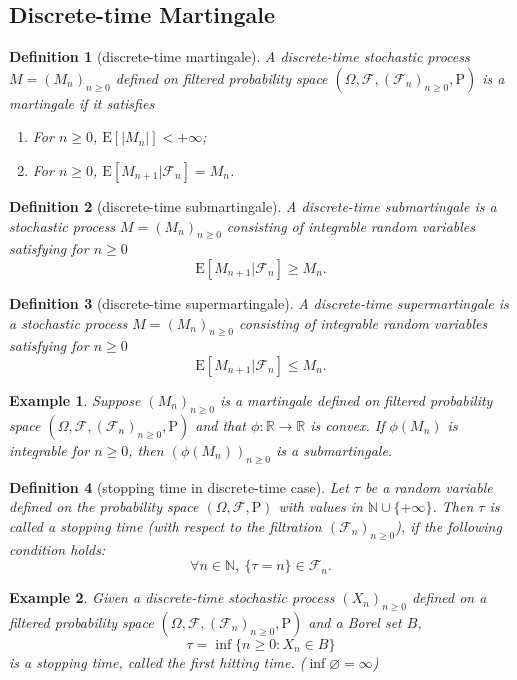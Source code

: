 \documentclass{article}
\newtheorem{definition}{Definition}[section]
\newtheorem{example}{Example}[section]
\theoremstyle{nonumberplain}
\begin{document}
\subsection{Discrete-time Martingale}
\begin{definition}[discrete-time martingale]
	A discrete-time stochastic process $M=(M_n)_{n\ge 0}$ defined on filtered probability space $(\Omega,\mathcal{F},(\mathcal{F}_{n})_{n\ge0},\mathrm{P})$ is a \emph{martingale} if it satisfies
	\begin{enumerate}
		\item For $n\ge0$, $\mathrm{E}[|M_n|]<+\infty$;
		\item For $n\ge0$, $\mathrm{E}[M_{n+1}|\mathcal{F}_n]=M_n$.
	\end{enumerate}
\end{definition}
\begin{definition}[discrete-time submartingale]
A discrete-time \emph{submartingale} is a stochastic process $M=(M_n)_{n\ge 0}$ consisting of integrable random variables satisfying for $n\ge0$
\[
\mathrm{E}[M_{n+1}|\mathcal{F}_n]\ge M_n.
\]
\end{definition}
\begin{definition}[discrete-time supermartingale]
	A discrete-time \emph{supermartingale} is a stochastic process $M=(M_n)_{n\ge 0}$ consisting of integrable random variables satisfying for $n\ge0$
	\[
	\mathrm{E}[M_{n+1}|\mathcal{F}_n]\le M_n.
	\]
\end{definition}

\begin{example}
	Suppose $(M_n)_{n\ge 0}$ is a martingale defined on filtered probability space $(\Omega,\mathcal{F},(\mathcal{F}_{n})_{n\ge0},\mathrm{P})$ and that $\phi:\mathbb{R}\to\mathbb{R}$ is convex. If $\phi(M_n)$ is integrable for $n\ge0$, then $\left(\phi(M_n)\right)_{n\ge 0}$ is a submartingale.
\end{example}

\begin{definition}[stopping time in discrete-time case]
	Let $\tau$  be a random variable defined on the probability space $(\Omega,\mathcal{F},\mathrm{P})$ with values in $\mathbb{N}\cup\{+\infty\}$. Then $\tau$ is called a stopping time (with respect to the filtration $(\mathcal{F}_{n})_{n\ge 0}$), if the following condition holds:
	\[
	\forall n\in\mathbb{N},\ \{\tau =n\}\in {\mathcal {F}}_{n}.
	\]
\end{definition}

\begin{example}
	Given a discrete-time stochastic process $(X_{n})_{n\ge 0}$ defined on a filtered probability space $(\Omega,\mathcal{F},(\mathcal{F}_{n})_{n\ge0 },\mathrm{P})$ and a Borel set $B$,
	\[
	\tau=\inf\{n\ge0:X_n\in B\}
	\]
	is a stopping time, called the \emph{first hitting time}. ($\inf\varnothing = \infty $)
\end{example}
\end{document}

